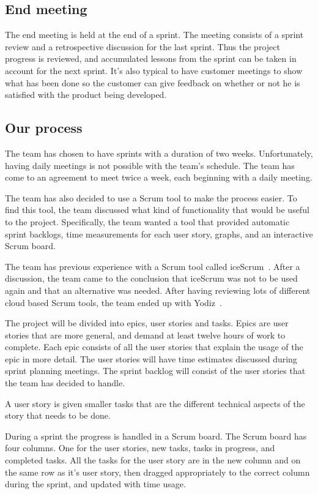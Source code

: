 \subsection{End meeting}
The end meeting is held at the end of a sprint. The meeting consists of a sprint review and a retrospective discussion 
for the last sprint.
Thus the project progress is reviewed, and accumulated lessons from the sprint can be taken in account for the
next sprint.
It's also typical to have customer meetings to show what has been done so the customer can give feedback on 
whether or not he is satisfied with the product being developed.

\subsection{Our process}
The team has chosen to have sprints with a duration of two weeks. Unfortunately, having daily meetings is not 
possible with the team's schedule. The team has come to an agreement to meet twice a week, each beginning with a daily meeting.

The team has also decided to use a Scrum tool to make the process easier.
To find this tool, the team discussed what kind of functionality that would be useful to the project. 
Specifically, the team wanted a tool that provided automatic sprint backlogs, time measurements for each user story, 
graphs, and an interactive Scrum board.

The team has previous experience with a Scrum tool called iceScrum~\cite{icescrum}. After a discussion, the team came to the conclusion 
that iceScrum was not to be used again and that an alternative was needed.
After having reviewing lots of different cloud based Scrum tools, the team ended up with Yodiz~\cite{yodiz}.

The project will be divided into epics, user stories and tasks. Epics are user stories that are more general, 
and demand at least twelve hours of work to complete. Each epic consists
of all the user stories that explain the usage of the epic in more detail.
The user stories will have time estimates discussed during sprint planning meetings.
The sprint backlog will consist of the user stories that the team has decided to handle.

A user story is given smaller tasks that are the different technical aspects of the story that needs to be done.

During a sprint the progress is handled in a Scrum board. The Scrum board has four columns. One for the user stories, new tasks, tasks in progress, and completed tasks.
All the tasks for the user story are in the new column and on the same row as it's user story, then dragged appropriately to the correct column during the sprint, and updated with time usage.
